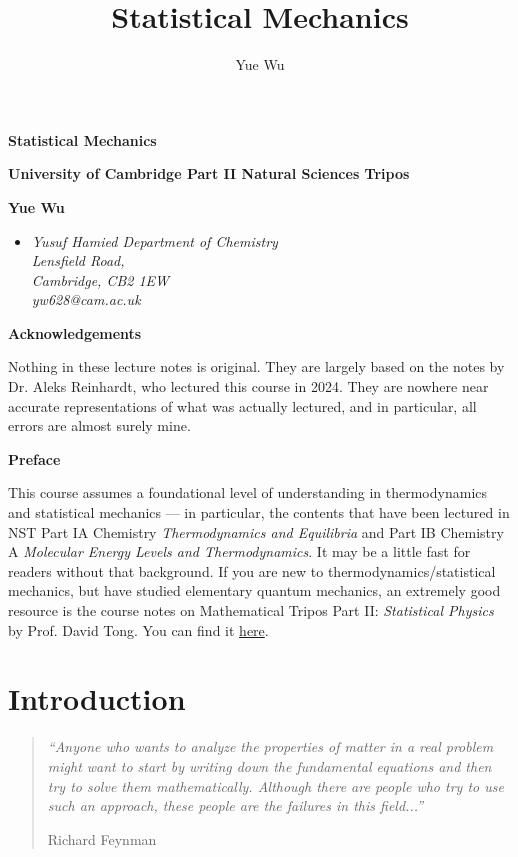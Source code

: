 \documentclass{article}
\title{Statistical Mechanics}
\author{Yue Wu}
\theoremstyle{plain}\theoremheaderfont{\normalfont\bfseries}\theorembodyfont{\rmfamily}\theoremseparator{.}\newtheorem*{thm}{Theorem}\newtheorem*{law}{Law}\newtheorem*{pos}{Postulate}
\numberwithin{equation}{section}
\begin{document}
    \setlength{\parindent}{0pt}
	\Huge\textsf{\textbf{Statistical Mechanics}}
		
	\Large\textsf{\textbf{University of Cambridge Part II Natural Sciences Tripos}}

	\noindent\makebox[\linewidth]{\rule{\textwidth}{2pt}}

	\large\textsf{\textbf{Yue Wu}}
	\begin{itemize}[topsep=0pt,leftmargin=15pt]
		\item[] \textit{Yusuf Hamied Department of Chemistry\\
		Lensfield Road,\\
		Cambridge, CB2 1EW}\\

		\textit{yw628@cam.ac.uk}
	\end{itemize}
    \thispagestyle{empty}
    \setlength{\parindent}{15pt}

    \newpage
    \begin{center}
		\textbf{\Large{Acknowledgements}}
	\end{center}
	\large
	Nothing in these lecture notes is original. They are largely based on the notes by Dr. Aleks Reinhardt, who lectured this course in 2024. They are nowhere near accurate representations of what was actually lectured, and in particular, all errors are almost surely mine.

    \vskip 30pt

    \begin{center}
		\textbf{\Large{Preface}}
	\end{center}
	\large
    This course assumes a foundational level of understanding in thermodynamics and statistical mechanics --- in particular, the contents that have been lectured in NST Part IA Chemistry \textit{Thermodynamics and Equilibria} and Part IB Chemistry A \textit{Molecular Energy Levels and Thermodynamics}. It may be a little fast for readers without that background. If you are new to thermodynamics/statistical mechanics, but have studied elementary quantum mechanics, an extremely good resource is the course notes on Mathematical Tripos Part II: \textit{Statistical Physics} by Prof. David Tong. You can find it \href{https://www.damtp.cam.ac.uk/user/tong/statphys.html}{\color{blue}here}.

    \normalsize
    \newpage
	\tableofcontents
	\newpage

    \section{Introduction}
    \begin{quote}
        \textit{``Anyone who wants to analyze the properties of matter in a real problem might want to start by writing down the fundamental equations and then try to solve them mathematically. Although there are people who try to use such an approach, these people are the failures in this field...''}

        \hfill Richard Feynman
    \end{quote}
\end{document}
